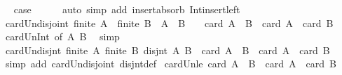 \begin{isabellebody}
\ \isamarkupfalse%
\ {\isacharquery}{\kern0pt}case\isanewline
\ \ \ \ \isamarkupfalse%
\ {\isacharparenleft}{\kern0pt}auto\ simp\ add{\isacharcolon}{\kern0pt}\ insert{\isacharunderscore}{\kern0pt}absorb\ Int{\isacharunderscore}{\kern0pt}insert{\isacharunderscore}{\kern0pt}left{\isacharparenright}{\kern0pt}\isanewline
{}\isamarkupfalse%
%
\endisatagproof
{\isafoldproof}%
%
\isadelimproof
\isanewline
%
\endisadelimproof
\isanewline
{}\isamarkupfalse%
\ card{\isacharunderscore}{\kern0pt}Un{\isacharunderscore}{\kern0pt}disjoint{\isacharcolon}{\kern0pt}\ {\isachardoublequoteopen}finite\ A\ {\isasymLongrightarrow}\ finite\ B\ {\isasymLongrightarrow}\ A\ {\isasyminter}\ B\ {\isacharequal}{\kern0pt}\ {\isacharbraceleft}{\kern0pt}{\isacharbraceright}{\kern0pt}\ {\isasymLongrightarrow}\ card\ {\isacharparenleft}{\kern0pt}A\ {\isasymunion}\ B{\isacharparenright}{\kern0pt}\ {\isacharequal}{\kern0pt}\ card\ A\ {\isacharplus}{\kern0pt}\ card\ B{\isachardoublequoteclose}\isanewline
%
\isadelimproof
\ \ %
\endisadelimproof
%
\isatagproof
{}\isamarkupfalse%
\ card{\isacharunderscore}{\kern0pt}Un{\isacharunderscore}{\kern0pt}Int\ {\isacharbrackleft}{\kern0pt}of\ A\ B{\isacharbrackright}{\kern0pt}\ \isamarkupfalse%
\ simp%
\endisatagproof
{\isafoldproof}%
%
\isadelimproof
\isanewline
%
\endisadelimproof
\isanewline
{}\isamarkupfalse%
\ card{\isacharunderscore}{\kern0pt}Un{\isacharunderscore}{\kern0pt}disjnt{\isacharcolon}{\kern0pt}\ {\isachardoublequoteopen}{\isasymlbrakk}finite\ A{\isacharsemicolon}{\kern0pt}\ finite\ B{\isacharsemicolon}{\kern0pt}\ disjnt\ A\ B{\isasymrbrakk}\ {\isasymLongrightarrow}\ card\ {\isacharparenleft}{\kern0pt}A\ {\isasymunion}\ B{\isacharparenright}{\kern0pt}\ {\isacharequal}{\kern0pt}\ card\ A\ {\isacharplus}{\kern0pt}\ card\ B{\isachardoublequoteclose}\isanewline
%
\isadelimproof
\ \ %
\endisadelimproof
%
\isatagproof
{}\isamarkupfalse%
\ {\isacharparenleft}{\kern0pt}simp\ add{\isacharcolon}{\kern0pt}\ card{\isacharunderscore}{\kern0pt}Un{\isacharunderscore}{\kern0pt}disjoint\ disjnt{\isacharunderscore}{\kern0pt}def{\isacharparenright}{\kern0pt}%
\endisatagproof
{\isafoldproof}%
%
\isadelimproof
\isanewline
%
\endisadelimproof
\isanewline
{}\isamarkupfalse%
\ card{\isacharunderscore}{\kern0pt}Un{\isacharunderscore}{\kern0pt}le{\isacharcolon}{\kern0pt}\ {\isachardoublequoteopen}card\ {\isacharparenleft}{\kern0pt}A\ {\isasymunion}\ B{\isacharparenright}{\kern0pt}\ {\isasymle}\ card\ A\ {\isacharplus}{\kern0pt}\ card\ B{\isachardoublequoteclose}\isanewline

\end{isabellebody}
